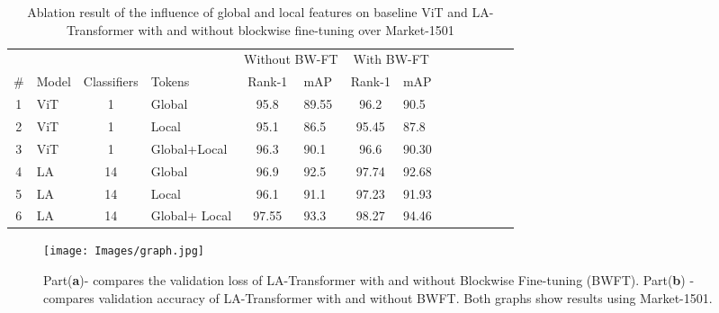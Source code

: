 \documentclass{article}
\begin{document}
\begin{table}
  \caption{Ablation result of the influence of global and local features on baseline ViT and LA-Transformer with and without blockwise fine-tuning over Market-1501}
  \centering
  \begin{tabular}{clclclclclclcl}
    \toprule
    \multicolumn{4 }{c}{} & \multicolumn{2}{c}{Without BW-FT} & \multicolumn{2}{c}{With BW-FT} \\ 
\cmidrule(r){5-6} \cmidrule(r){7-8}
\# & Model  & Classifiers     & Tokens   & Rank-1     & mAP     & Rank-1     & mAP \\
    \midrule
    1 & ViT  & 1    & Global  & 95.8	& 89.55 & 96.2 & 90.5    \\
    2 & ViT     & 1  & Local & 95.1 & 86.5	& 95.45	& 87.8 \\
    3 & ViT     & 1  & Global+Local & 96.3	& 90.1	& 96.6	& 90.30  \\
    4 & LA & 14 & Global   & 96.9	& 92.5	& 97.74	& 92.68      \\
    5 & LA & 14 & Local    &  96.1	& 91.1	& 97.23	& 91.93   \\
  6 & LA & 14 & Global+ Local  & 97.55	& 93.3	& 98.27	&  94.46   \\
    \bottomrule
  \end{tabular}
  \label{ModelsOverview}
\end{table}

\begin{figure}[htp]
    \centering
    \texttt{[image: Images/graph.jpg]}
    \label{fig:graph}
    \caption{Part(\textbf{a})- compares the validation loss of LA-Transformer with and without Blockwise Fine-tuning (BWFT). Part(\textbf{b}) - compares validation accuracy of LA-Transformer with and without BWFT.  Both graphs show results using Market-1501. }
\end{figure}
\end{document}
